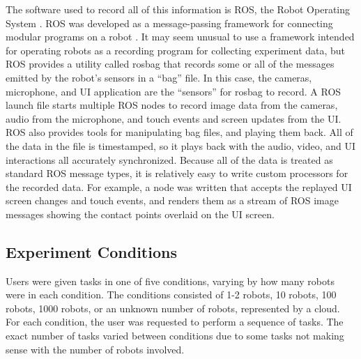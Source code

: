 \documentclass[]{article}
\begin{document}
The software used to record all of this information is ROS, the Robot Operating System . 
ROS was developed as a message-passing framework for connecting modular programs on a robot . 
It may seem unusual to use a framework intended for operating robots as a recording program for collecting experiment data, but ROS provides a utility called rosbag that records some or all of the messages emitted by the robot's sensors in a ``bag'' file. 
In this case, the cameras, microphone, and UI application are the ``sensors'' for rosbag to record.
A ROS launch file starts multiple ROS nodes to record image data from the cameras, audio from the microphone, and touch events and screen updates from the UI.
ROS also provides tools for manipulating bag files, and playing them back. 
All of the data in the file is timestamped, so it plays back with the audio, video, and UI interactions all accurately synchronized. 
Because all of the data is treated as standard ROS message types, it is relatively easy to write custom processors for the recorded data.
For example, a node was written that accepts the replayed UI screen changes and touch events, and renders them as a stream of ROS image messages showing the contact points overlaid on the UI screen. 

\subsection{Experiment Conditions}

Users were given tasks in one of five conditions, varying by how many robots were in each condition. 
The conditions consisted of 1-2 robots, 10 robots, 100 robots, 1000 robots, or an unknown number of robots, represented by a cloud. 
For each condition, the user was requested to perform a sequence of tasks. 
The exact number of tasks varied between conditions due to some tasks not making sense with the number of robots involved. 
\end{document}
